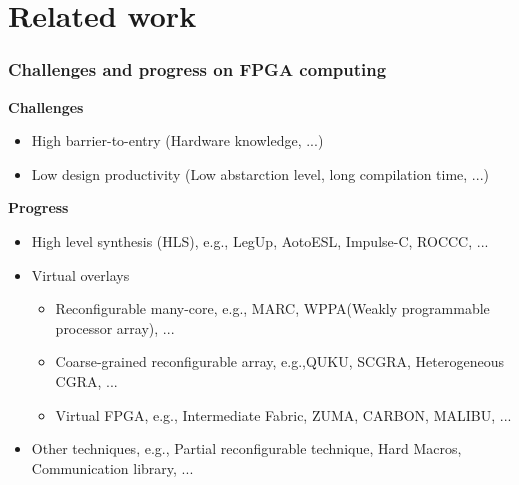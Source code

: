 \documentclass{beamer}
\begin{document}
\section{Related work}
\begin{frame}[t]
\frametitle{Challenges and progress on FPGA computing}

\vspace{-1em}
\textbf{Challenges}
\begin{itemize}
\item High barrier-to-entry (Hardware knowledge, ...)
\item Low design productivity (Low abstarction level, long compilation time, ...)
\end{itemize}

\textbf{Progress}
\begin{itemize}

\item High level synthesis (HLS), e.g., LegUp, AotoESL, Impulse-C, ROCCC, ...

\item Virtual overlays
\footnotesize
\begin{itemize}
\item[\checkmark] Reconfigurable many-core, e.g., MARC, WPPA(Weakly programmable processor array), ...
\item[\checkmark] Coarse-grained reconfigurable array, e.g.,QUKU, SCGRA, Heterogeneous CGRA, ... 
\item[\checkmark] Virtual FPGA, e.g., Intermediate Fabric, ZUMA, CARBON, MALIBU, ...
\end{itemize}
\normalsize 

\item Other techniques, e.g., Partial reconfigurable technique, Hard Macros, Communication library, ...

\end{itemize}
\end{frame}
\end{document}
